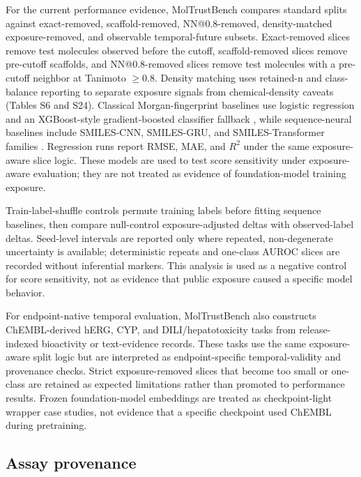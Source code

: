\documentclass[unnumsec,webpdf,contemporary,large,numbered]{oup-authoring-template}
\begin{document}
For the current performance evidence, MolTrustBench compares standard splits against exact-removed, scaffold-removed, NN@0.8-removed, density-matched exposure-removed, and observable temporal-future subsets. Exact-removed slices remove test molecules observed before the cutoff, scaffold-removed slices remove pre-cutoff scaffolds, and NN@0.8-removed slices remove test molecules with a pre-cutoff neighbor at Tanimoto $\geq 0.8$. Density matching uses retained-n and class-balance reporting to separate exposure signals from chemical-density caveats (Tables S6 and S24). Classical Morgan-fingerprint baselines use logistic regression and an XGBoost-style gradient-boosted classifier fallback \cite{ecfp2010,xgboost2016,scikitlearn2011}, while sequence-neural baselines include SMILES-CNN, SMILES-GRU, and SMILES-Transformer families \cite{weininger1988,honda2019smilestransformer}. Regression runs report RMSE, MAE, and $R^2$ under the same exposure-aware slice logic. These models are used to test score sensitivity under exposure-aware evaluation; they are not treated as evidence of foundation-model training exposure.

Train-label-shuffle controls permute training labels before fitting sequence baselines, then compare null-control exposure-adjusted deltas with observed-label deltas. Seed-level intervals are reported only where repeated, non-degenerate uncertainty is available; deterministic repeats and one-class AUROC slices are recorded without inferential markers. This analysis is used as a negative control for score sensitivity, not as evidence that public exposure caused a specific model behavior.

For endpoint-native temporal evaluation, MolTrustBench also constructs ChEMBL-derived hERG, CYP, and DILI/hepatotoxicity tasks from release-indexed bioactivity or text-evidence records. These tasks use the same exposure-aware split logic but are interpreted as endpoint-specific temporal-validity and provenance checks. Strict exposure-removed slices that become too small or one-class are retained as expected limitations rather than promoted to performance results. Frozen foundation-model embeddings are treated as checkpoint-light wrapper case studies, not evidence that a specific checkpoint used ChEMBL during pretraining.

\subsection{Assay provenance}
\end{document}
